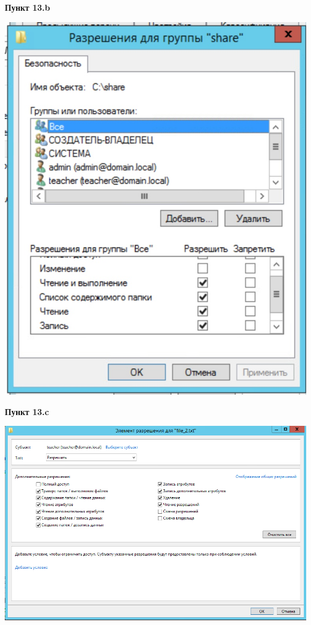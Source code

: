 \documentclass[a4paper,14pt]{extarticle}
\begin{document}
    \textbf{Пункт 13.b}
    \begin{center}
        \includegraphics[scale=0.4]{13.b.jpg}
    \end{center}
    \newpage
    \textbf{Пункт 13.c}
    \begin{center}
        \includegraphics[scale=0.7]{13.c.png}
    \end{center}
\end{document}
